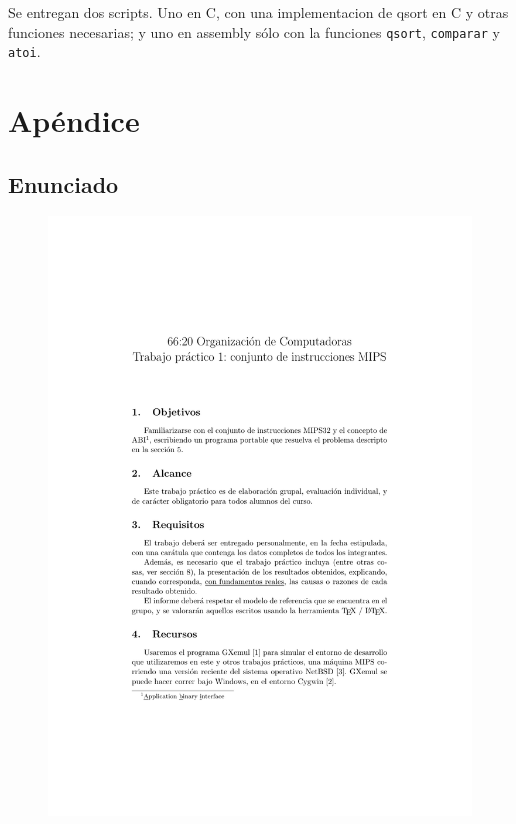 \documentclass[a4paper, 12pt]{article}
\begin{document}
	Se entregan dos scripts. Uno en C, con una implementacion de qsort en C y otras funciones necesarias; y uno en assembly sólo con la funciones \texttt{qsort}, \texttt{comparar} y \texttt{atoi}.
	
	\newpage
	\section{Apéndice}
	\subsection{Enunciado}

	\begin{figure}[H]
		\centering
		\includegraphics[scale=1, page = 1, clip, trim=1.5in 1.5in 20mm 35mm]{files/enunciado.pdf}
	\end{figure}
	
\end{document}
